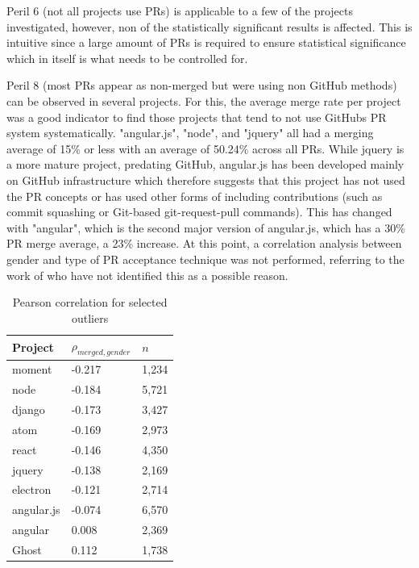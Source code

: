 Peril 6 (not all projects use \ac{PR}s) is applicable to a few of the projects investigated, however, non of the statistically significant results is affected. This is intuitive since a large amount of \ac{PR}s is required to ensure statistical significance which in itself is what needs to be controlled for.

Peril 8 (most \ac{PR}s appear as non-merged but were using non GitHub methods) can be observed in several projects. For this, the average merge rate per project was a good indicator to find those projects that tend to not use GitHubs \ac{PR} system systematically. "angular.js", "node", and "jquery" all had a merging average of 15\% or less with an average of 50.24\% across all \ac{PR}s. While jquery is a more mature project, predating GitHub, angular.js has been developed mainly on GitHub infrastructure which therefore suggests that this project has not used the \ac{PR} concepts or has used other forms of including contributions (such as commit squashing or Git-based git-request-pull commands). This has changed with "angular", which is the second major version of angular.js, which has a 30\% \ac{PR} merge average, a 23\% increase. At this point, a correlation analysis between gender and type of \ac{PR} acceptance technique was not performed, referring to the work of \citeauthor{genderdiff:2016} who have not identified this as a possible reason.

\begin{table}[!t]
\renewcommand{\arraystretch}{1.3}
          \caption{Pearson correlation for selected outliers}
          \label{table:pearsonoutliers}
          \centering

          \begin{tabular} {  l | l | l}
          \textbf{Project}        &       $\rho_{merged,gender}$        &    $n$        \\ \hline
        moment            &    -0.217                    &    1,234        \\
        node            &    -0.184                    &    5,721        \\
        django            &   -0.173                    &   3,427        \\
        atom            &    -0.169                    &    2,973        \\
        react            &    -0.146                    &    4,350        \\
        jquery            &    -0.138                    &    2,169        \\
        electron        &    -0.121                      &    2,714        \\
        angular.js        &    -0.074                    &    6,570        \\
        angular            &     0.008                    &    2,369        \\
        Ghost            &     0.112                     &    1,738        \\

         \end{tabular}

\end{table}

